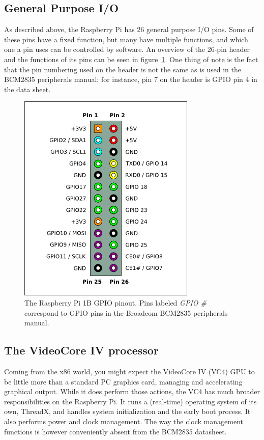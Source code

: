 \documentclass[twoside]{uva-inf-bachelor-thesis}
\begin{document}
\subsection{General Purpose I/O}
As described above, the Raspberry Pi has 26 general purpose I/O pins. Some of these pins have a fixed function, but many have multiple functions, and which one a pin uses can be controlled by software. An overview of the 26-pin header and the functions of its pins can be seen in figure~\ref{fig:gpiopinout}. One thing of note is the fact that the pin numbering used on the header is not the same as is used in the BCM2835 peripherals manual; for instance, pin 7 on the header is GPIO pin 4 in the data sheet.

\begin{figure}[ht]
    \centering
    \includegraphics[scale=0.5]{Pi-GPIO-header-26-sm.png}
    \caption{The Raspberry Pi 1B GPIO pinout. Pins labeled \textit{GPIO \#} correspond to GPIO pins in the Broadcom BCM2835 peripherals manual\cite{bcm:2835peripherals}.}
    \label{fig:gpiopinout}
\end{figure}

\subsection{The VideoCore IV processor}
Coming from the x86 world, you might expect the VideoCore IV (VC4) GPU to be little more than a standard PC graphics card, managing and accelerating graphical output. While it does perform those actions, the VC4 has much broader responsibilities on the Raspberry Pi. It runs a (real-time) operating system of its own, ThreadX\cite{rpi:opensourcevpu}, and handles system initialization and the early boot process\cite{rpi:bootforum}. It also performs power and clock management\cite{rpi:gpuclockpower}. The way the clock management functions is however conveniently absent from the BCM2835 datasheet.
\end{document}
